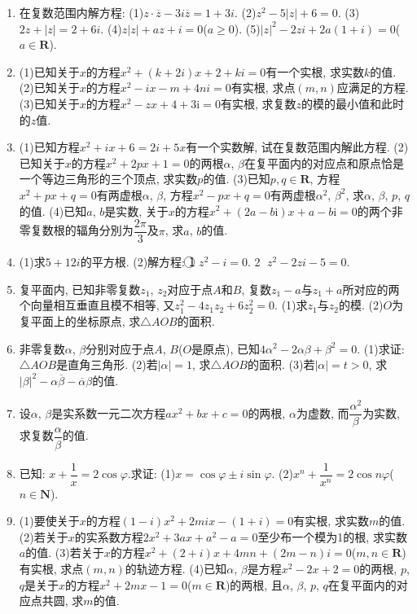 \documentclass[10pt,a4paper]{article}
\newcommand{\blank}[1]{\underline{\hbox to #1pt{}}}
\begin{document}
\begin{enumerate}[1.]
(1)若$\alpha ^2+\beta ^2=0$, 则$\triangle OMN$是\blank{50}三角形.
(2)若$2\alpha ^2-2\alpha \beta +\beta ^2=0$, 则$\triangle OMN$是\blank{50}三角形.
\item 在复数范围内解方程:
(1)$z\cdot \overline z-3i\overline z=1+3i$.				(2)$z^2-5|z|+6=0$.
(3)$2z+|z|=2+6i$.					(4)$z|z|+az+i=0$($a\ge 0$).
(5)$|z|^2-2zi+2a(1+i)=0$($a\in \mathbf{R}$).
\item (1)已知关于$x$的方程$x^2+(k+2i)x+2+ki=0$有一个实根, 求实数$k$的值.
(2)已知关于$x$的方程$x^2-ix-m+4ni=0$有实根, 求点$(m,n)$应满足的方程.
(3)已知关于$x$的方程$x^2-zx+4+3\mathrm{i}=0$有实根, 求复数$z$的模的最小值和此时的$z$值.
\item (1)已知方程$x^2+ix+6=2i+5x$有一个实数解, 试在复数范围内解此方程.
(2)已知关于$x$的方程$x^2+2px+1=0$的两根$\alpha$, $\beta$在复平面内的对应点和原点恰是一个等边三角形的三个顶点, 求实数$p$的值.
(3)已知$p,q\in \mathbf{R}$, 方程$x^2+px+q=0$有两虚根$\alpha$, $\beta$, 方程$x^2-px+q=0$有两虚根$\alpha ^2$, $\beta ^2$, 求$\alpha$, $\beta$, $p$, $q$的值.
(4)已知$a$, $b$是实数, 关于$x$的方程$x^2+(2a-b\mathrm{i})x+a-b\mathrm{i}=0$的两个非零复数根的辐角分別为$\dfrac{2\pi }3$及$\pi$, 求$a$, $b$的值.
\item (1)求$5+12i$的平方根.
(2)解方程: \textcircled{1} $z^2-i=0$.				\textcircled{2} $z^2-2zi-5=0$.
\item 复平面内, 已知非零复数$z_1$, $z_2$对应于点$A$和$B$, 复数$z_1-a$与$z_1+a$所对应的两个向量相互垂直且模不相等, 又$z_1^2-4z_1z_2+6z_2^2=0$.
(1)求$z_1$与$z_2$的模.
(2)$O$为复平面上的坐标原点, 求$\triangle AOB$的面积.
\item 非零复数$\alpha$, $\beta$分别对应于点$A$, $B$($O$是原点), 已知$4\alpha ^2-2\alpha \beta +\beta ^2=0$.
(1)求证: $\triangle AOB$是直角三角形.
(2)若$|\alpha|=1$, 求$\triangle AOB$的面积.
(3)若$|\alpha|=t>0$, 求$|\beta|^2-\alpha \overline \beta -\overline \alpha \beta$的值.
\item 设$\alpha$, $\beta$是实系数一元二次方程$ax^2+bx+c=0$的两根, $\alpha$为虚数, 而$\dfrac{{{\alpha }^2}}{\beta }$为实数, 求复数$\dfrac{\alpha }{\beta }$的值.
\item 已知: $x+\dfrac 1x=2\cos \varphi$.求证:
(1)$x=\cos \varphi \pm i\sin \varphi$.
(2)$x^n+\dfrac 1{x^n}=2\cos n\varphi$($n\in \mathbf{N}$).
\item (1)要使关于$x$的方程$(1-i)x^2+2mix-(1+i)=0$有实根, 求实数$m$的值.
(2)若关于$x$的实系数方程$2x^2+3ax+a^2-a=0$至少布一个模为1的根, 求实数$a$的值.
(3)若关于$x$的方程$x^2+(2+i)x+4mn+(2m-n)i=0$($m,n\in \mathbf{R}$)有实根, 求点$(m,n)$的轨迹方程.
(4)已知$\alpha$, $\beta$是方程$x^2-2x+2=0$的两根, $p$, $q$是关于$x$的方程$x^2+2mx-1=0$($m\in \mathbf{R}$)的两根, 且$\alpha$, $\beta$, $p$, $q$在复平面内的对应点共圆, 求$m$的值.

\end{enumerate}
\end{document}

